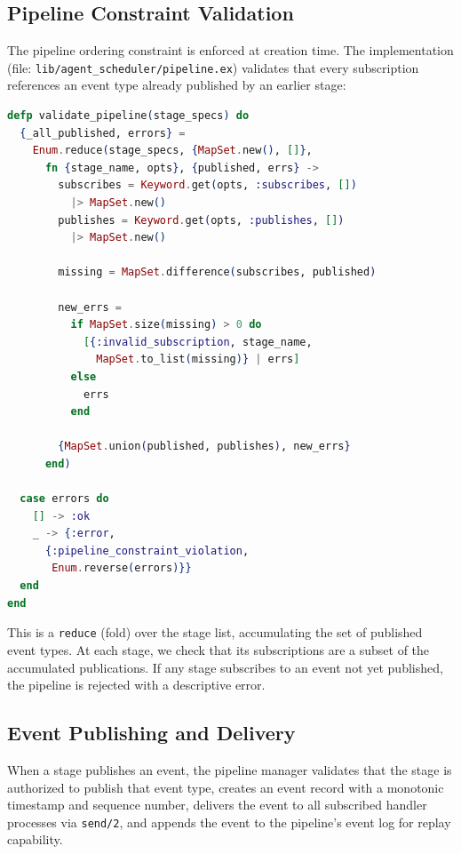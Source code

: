 \documentclass[12pt,a4paper]{article}
\theoremstyle{definition}
\theoremstyle{remark}
\begin{document}
\subsection{Pipeline Constraint Validation}

The pipeline ordering constraint is enforced at creation time. The implementation (file: \texttt{lib/agent\_scheduler/pipeline.ex}) validates that every subscription references an event type already published by an earlier stage:

\begin{lstlisting}[language=elixir, caption={Pipeline constraint validation (from \texttt{pipeline.ex})}, label={lst:validate-pipeline}]
defp validate_pipeline(stage_specs) do
  {_all_published, errors} =
    Enum.reduce(stage_specs, {MapSet.new(), []},
      fn {stage_name, opts}, {published, errs} ->
        subscribes = Keyword.get(opts, :subscribes, [])
          |> MapSet.new()
        publishes = Keyword.get(opts, :publishes, [])
          |> MapSet.new()

        missing = MapSet.difference(subscribes, published)

        new_errs =
          if MapSet.size(missing) > 0 do
            [{:invalid_subscription, stage_name,
              MapSet.to_list(missing)} | errs]
          else
            errs
          end

        {MapSet.union(published, publishes), new_errs}
      end)

  case errors do
    [] -> :ok
    _ -> {:error,
      {:pipeline_constraint_violation,
       Enum.reverse(errors)}}
  end
end
\end{lstlisting}

This is a \texttt{reduce} (fold) over the stage list, accumulating the set of published event types. At each stage, we check that its subscriptions are a subset of the accumulated publications. If any stage subscribes to an event not yet published, the pipeline is rejected with a descriptive error.

\subsection{Event Publishing and Delivery}

When a stage publishes an event, the pipeline manager validates that the stage is authorized to publish that event type, creates an event record with a monotonic timestamp and sequence number, delivers the event to all subscribed handler processes via \texttt{send/2}, and appends the event to the pipeline's event log for replay capability.
\end{document}
